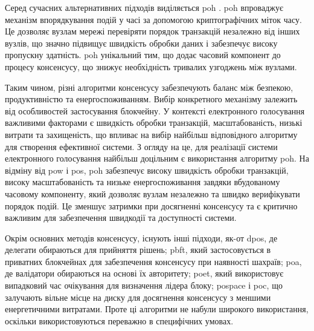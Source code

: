\documentclass[14pt]{extreport}
\begin{document}
  Серед сучасних альтернативних підходів виділяється \gls{poh} \cite{poh}. \gls{poh} впроваджує механізм впорядкування подій у часі за допомогою криптографічних міток часу. Це дозволяє вузлам мережі перевіряти порядок транзакцій незалежно від інших вузлів, що значно підвищує швидкість обробки даних і забезпечує високу пропускну здатність. \gls{poh} унікальний тим, що додає часовий компонент до процесу консенсусу, що знижує необхідність тривалих узгоджень між вузлами.

  \begin{table}[H]
  \caption{\\\centering\textbf{Порівняння алгоритмів консенсусу}}
  \label{tab:consensus_comparison}
  \end{table}
  
  Таким чином, різні алгоритми консенсусу забезпечують баланс між безпекою, продуктивністю та енергоспоживанням. Вибір конкретного механізму залежить від особливостей застосування блокчейну. У контексті електронного голосування важливими факторами є швидкість обробки транзакцій, масштабованість, низькі витрати та захищеність, що впливає на вибір найбільш відповідного алгоритму для створення ефективної системи. З огляду на це, для реалізації системи електронного голосування найбільш доцільним є використання алгоритму \gls{poh}. На відміну від \gls{pow} і \gls{pos}, \gls{poh} забезпечує високу швидкість обробки транзакцій, високу масштабованість та низьке енергоспоживання завдяки вбудованому часовому компоненту, який дозволяє вузлам незалежно та швидко верифікувати порядок подій. Це зменшує затримки при досягненні консенсусу та є критично важливим для забезпечення швидкодії та доступності системи.
  
  Окрім основних методів консенсусу, існують інші підходи, як-от \gls{dpos}, де делегати обираються для прийняття рішень; \gls{pbft}, який застосовується в приватних блокчейнах для забезпечення консенсусу при наявності шахраїв; \gls{poa}, де валідатори обираються на основі їх авторитету; \gls{poet}, який використовує випадковий час очікування для визначення лідера блоку; \gls{pospace} і \gls{poc}, що залучають вільне місце на диску для досягнення консенсусу з меншими енергетичними витратами. Проте ці алгоритми не набули широкого використання, оскільки використовуються переважно в специфічних умовах.
  
\end{document}

